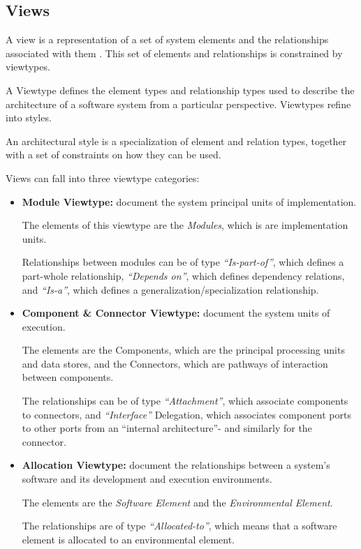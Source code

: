 \subsection{Views}
A view is a representation of a set of system elements and the relationships associated with them \cite{clements2003documenting}. This set of elements and relationships is constrained by viewtypes.

A Viewtype defines the element types and relationship types used to describe the architecture of a software system from a particular perspective. Viewtypes refine into styles.

An architectural style is a specialization of element and relation types, together with a set of constraints on how they can be used.

Views can fall into three viewtype categories:
\begin{itemize}
\item \textbf{Module Viewtype:} document the system principal units of implementation. 

The elements of this viewtype are the \textit{Modules}, which is are implementation units. 

Relationships between modules can be of type \textit{``Is-part-of''}, which defines a part-whole relationship, \textit{``Depends on''}, which defines dependency relations, and \textit{``Is-a''}, which defines a generalization/specialization relationship.

\item \textbf{Component \& Connector Viewtype:} document the system units of execution. 

The elements are the Components, which are the principal processing units and data stores, and the Connectors, which are pathways of interaction between components. 

The relationships can be of type \textit{``Attachment''}, which associate components to connectors, and \textit{``Interface''} Delegation, which associates component ports to other ports from an ``internal architecture''- and similarly for the connector.

\item \textbf{Allocation Viewtype:} document the relationships between a system's software and its development and execution environments. 

The elements are the \textit{Software Element} and the \textit{Environmental Element}. 

The relationships are of type \textit{``Allocated-to''}, which means that a software element is allocated to an environmental element. 
\end{itemize}

